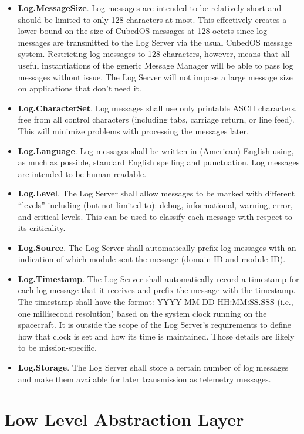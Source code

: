 \begin{itemize}
  \item \textbf{Log.MessageSize}. Log messages are intended to be relatively short and should be
    limited to only 128 characters at most. This effectively creates a lower bound on the size
    of CubedOS messages at 128 octets since log messages are transmitted to the Log Server via
    the usual CubedOS message system. Restricting log messages to 128 characters, however, means
    that all useful instantiations of the generic Message Manager will be able to pass log
    messages without issue. The Log Server will not impose a large message size on applications
    that don't need it.
  \item \textbf{Log.CharacterSet}. Log messages shall use only printable ASCII characters, free
    from all control characters (including tabs, carriage return, or line feed). This will
    minimize problems with processing the messages later.
  \item \textbf{Log.Language}. Log messages shall be written in (American) English using, as
    much as possible, standard English spelling and punctuation. Log messages are intended to be
    human-readable.
  \item \textbf{Log.Level}. The Log Server shall allow messages to be marked with different
    ``levels'' including (but not limited to): debug, informational, warning, error, and
    critical levels. This can be used to classify each message with respect to its criticality.
  \item \textbf{Log.Source}. The Log Server shall automatically prefix log messages with an
    indication of which module sent the message (domain ID and module ID).
  \item \textbf{Log.Timestamp}. The Log Server shall automatically record a timestamp for each
    log message that it receives and prefix the message with the timestamp. The timestamp shall
    have the format: YYYY-MM-DD HH:MM:SS.SSS (i.e., one millisecond resolution) based on the
    system clock running on the spacecraft. It is outside the scope of the Log Server's
    requirements to define how that clock is set and how its time is maintained. Those details
    are likely to be mission-specific.
  \item \textbf{Log.Storage}. The Log Server shall store a certain number of log messages and
    make them available for later transmission as telemetry messages. 
\end{itemize}

\section{Low Level Abstraction Layer}
\label{sec:llal}

